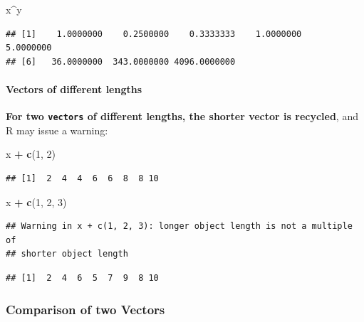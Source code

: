 \documentclass[]{book}
\newenvironment{Shaded}{\begin{snugshade}}{\end{snugshade}}
\newcommand{\DecValTok}[1]{\textcolor[rgb]{0.00,0.00,0.81}{#1}}
\newcommand{\KeywordTok}[1]{\textcolor[rgb]{0.13,0.29,0.53}{\textbf{#1}}}
\newcommand{\NormalTok}[1]{#1}
\newcommand{\OperatorTok}[1]{\textcolor[rgb]{0.81,0.36,0.00}{\textbf{#1}}}
\newcommand{\StringTok}[1]{\textcolor[rgb]{0.31,0.60,0.02}{#1}}
\let\oldparagraph\paragraph
\renewcommand{\paragraph}[1]{\oldparagraph{#1}\mbox{}}
\theoremstyle{definition}
\theoremstyle{definition}
\theoremstyle{definition}
\theoremstyle{remark}
\begin{document}
\begin{Shaded}
\begin{Highlighting}[]
\NormalTok{x}\OperatorTok{^}\NormalTok{y}
\end{Highlighting}
\end{Shaded}

\begin{verbatim}
## [1]    1.0000000    0.2500000    0.3333333    1.0000000    5.0000000
## [6]   36.0000000  343.0000000 4096.0000000
\end{verbatim}

\hypertarget{vectors-of-different-lengths}{%
\paragraph{Vectors of different
lengths}\label{vectors-of-different-lengths}}

\textbf{For two \texttt{vectors} of different lengths, the shorter
vector is recycled}, and R may issue a warning:

\begin{Shaded}
\begin{Highlighting}[]
\NormalTok{x }\OperatorTok{+}\StringTok{ }\KeywordTok{c}\NormalTok{(}\DecValTok{1}\NormalTok{, }\DecValTok{2}\NormalTok{)}
\end{Highlighting}
\end{Shaded}

\begin{verbatim}
## [1]  2  4  4  6  6  8  8 10
\end{verbatim}

\begin{Shaded}
\begin{Highlighting}[]
\NormalTok{x }\OperatorTok{+}\StringTok{ }\KeywordTok{c}\NormalTok{(}\DecValTok{1}\NormalTok{, }\DecValTok{2}\NormalTok{, }\DecValTok{3}\NormalTok{)}
\end{Highlighting}
\end{Shaded}

\begin{verbatim}
## Warning in x + c(1, 2, 3): longer object length is not a multiple of
## shorter object length
\end{verbatim}

\begin{verbatim}
## [1]  2  4  6  5  7  9  8 10
\end{verbatim}

\hypertarget{comparison-of-two-vectors}{%
\subsubsection{Comparison of two
Vectors}\label{comparison-of-two-vectors}}
\end{document}
